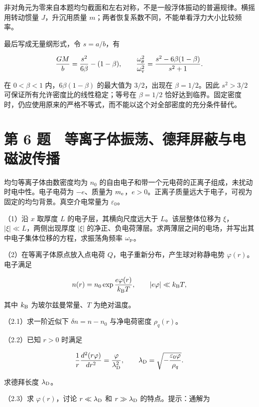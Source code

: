 \documentclass[12pt,a4paper,fontset=fandol]{ctexart}
\begin{document}
\begin{minipage}{\linewidth}
非对角元为零来自本题均匀截面和左右对称，不是一般浮体振动的普遍规律。横摇用转动惯量
\(J\)，升沉用质量 \(m\)；两者恢复系数不同，不能单看浮力大小比较频率。

最后写成无量纲形式，令 \(s=a/b\)，有

\[
\frac{GM}{b}=\frac{s^2}{6\beta}-(1-\beta),\qquad
\frac{\omega_\theta^2}{\omega_{\rm v}^2}
=\frac{s^2-6\beta(1-\beta)}{s^2+1}.
\]

在 \(0<\beta<1\) 内，\(6\beta(1-\beta)\) 的最大值为 \(3/2\)，出现在
\(\beta=1/2\)。因此 \(s^2>3/2\) 可保证所有允许密度比的线性稳定；等号在
\(\beta=1/2\)
恰好达到临界。固定密度时，仍应使用原来的严格不等式，而不能以这个对全部密度的充分条件替代。


\end{minipage}\par
\clearpage

\section{第 6
题　等离子体振荡、德拜屏蔽与电磁波传播}\label{ux7b2c-6-ux9898-ux7b49ux79bbux5b50ux4f53ux632fux8361ux5fb7ux62dcux5c4fux853dux4e0eux7535ux78c1ux6ce2ux4f20ux64ad}

均匀等离子体由数密度均为 \(n_0\)
的自由电子和带一个元电荷的正离子组成，未扰动时电中性。电子电荷为
\(-e\)、质量为
\(m_{\rm e}\)，\(e>0\)。正离子质量远大于电子，可视为固定的均匀背景。真空介电常量为
\(\varepsilon_0\)。

（1）沿 \(x\) 取厚度 \(L\) 的电子层，其横向尺度远大于
\(L\)。该层整体位移为 \(\xi\)，\(|\xi|\ll L\)，两侧出现厚度 \(|\xi|\)
的净正、负电荷薄层。求两薄层之间的电场，并写出其中电子集体位移的方程，求振荡角频率
\(\omega_{\rm p}\)。

（2）在等离子体原点放入点电荷 \(Q\)，电子重新分布，产生球对称静电势
\(\varphi(r)\)。电子满足

\[
n(r)=n_0\exp\frac{e\varphi(r)}{k_{\rm B}T},\qquad
|e\varphi|\ll k_{\rm B}T,
\]

其中 \(k_{\rm B}\) 为玻尔兹曼常量、\(T\) 为绝对温度。

（2.1）求一阶近似下 \(\delta n=n-n_0\) 与净电荷密度 \(\rho_q(r)\)。

（2.2）已知 \(r>0\) 时满足

\[
\frac1r\frac{d^2(r\varphi)}{dr^2}=\frac{\varphi}{\lambda_{\rm D}^2},
\qquad \lambda_{\rm D}=\sqrt{-\frac{\varepsilon_0\varphi}{\rho_q}}.
\]

求德拜长度 \(\lambda_{\rm D}\)。

（2.3）求 \(\varphi(r)\)，讨论 \(r\ll\lambda_{\rm D}\) 和
\(r\gg\lambda_{\rm D}\) 的特点。提示：通解为
\end{document}
